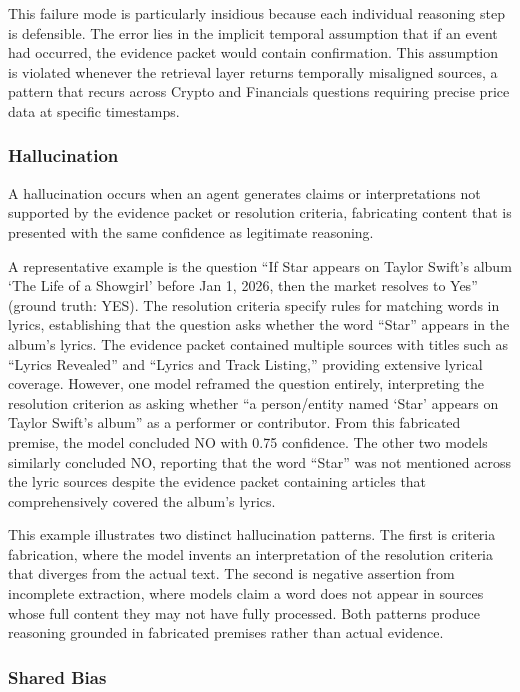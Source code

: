 This failure mode is particularly insidious because each individual reasoning step is defensible. The error lies in the implicit temporal assumption that if an event had occurred, the evidence packet would contain confirmation. This assumption is violated whenever the retrieval layer returns temporally misaligned sources, a pattern that recurs across Crypto and Financials questions requiring precise price data at specific timestamps.


\subsubsection{Hallucination}

A hallucination occurs when an agent generates claims or interpretations not supported by the evidence packet or resolution criteria, fabricating content that is presented with the same confidence as legitimate reasoning.

A representative example is the question ``If Star appears on Taylor Swift's album `The Life of a Showgirl' before Jan 1, 2026, then the market resolves to Yes'' (ground truth: YES). The resolution criteria specify rules for matching words in lyrics, establishing that the question asks whether the word ``Star'' appears in the album's lyrics. The evidence packet contained multiple sources with titles such as ``Lyrics Revealed'' and ``Lyrics and Track Listing,'' providing extensive lyrical coverage. However, one model reframed the question entirely, interpreting the resolution criterion as asking whether ``a person/entity named `Star' appears on Taylor Swift's album'' as a performer or contributor. From this fabricated premise, the model concluded NO with 0.75 confidence. The other two models similarly concluded NO, reporting that the word ``Star'' was not mentioned across the lyric sources despite the evidence packet containing articles that comprehensively covered the album's lyrics.

This example illustrates two distinct hallucination patterns. The first is criteria fabrication, where the model invents an interpretation of the resolution criteria that diverges from the actual text. The second is negative assertion from incomplete extraction, where models claim a word does not appear in sources whose full content they may not have fully processed. Both patterns produce reasoning grounded in fabricated premises rather than actual evidence.

\subsubsection{Shared Bias}

